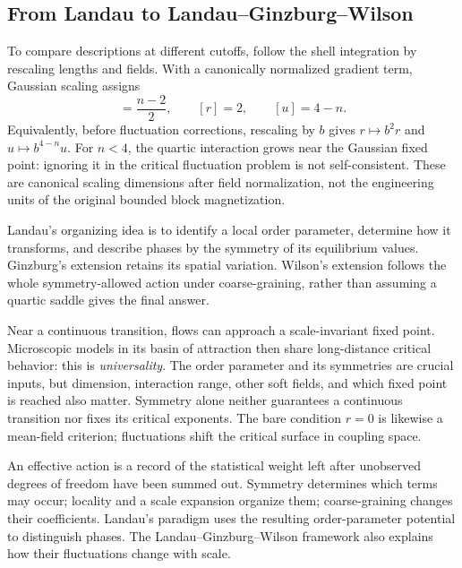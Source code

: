 \documentclass[11pt]{article}
\begin{document}
\subsection{From Landau to Landau--Ginzburg--Wilson}

To compare descriptions at different cutoffs, follow the shell integration
by rescaling lengths and fields. With a canonically normalized gradient
term, Gaussian scaling assigns
\begin{equation}
[m]=\frac{n-2}{2},\qquad [r]=2,\qquad [u]=4-n.
\end{equation}
Equivalently, before fluctuation corrections, rescaling by \(b\) gives
\(r\mapsto b^2r\) and \(u\mapsto b^{4-n}u\).
For \(n<4\), the quartic interaction grows near the Gaussian fixed point:
ignoring it in the critical fluctuation problem is not self-consistent.
These are canonical scaling dimensions after field normalization, not
the engineering units of the original bounded block magnetization.

Landau's organizing idea is to identify a local order parameter, determine
how it transforms, and describe phases by the symmetry of its equilibrium
values. Ginzburg's extension retains its spatial variation. Wilson's
extension follows the whole symmetry-allowed action under coarse-graining,
rather than assuming a quartic saddle gives the final answer.

Near a continuous transition, flows can approach a scale-invariant fixed
point. Microscopic models in its basin of attraction then share
long-distance critical behavior: this is \emph{universality}. The order
parameter and its symmetries are crucial inputs, but dimension, interaction
range, other soft fields, and which fixed point is reached also matter.
Symmetry alone neither guarantees a continuous transition nor fixes its
critical exponents. The bare condition \(r=0\) is likewise a mean-field
criterion; fluctuations shift the critical surface in coupling space.

\begin{keyidea}
An effective action is a record of the statistical weight left after
unobserved degrees of freedom have been summed out. Symmetry determines
which terms may occur; locality and a scale expansion organize them;
coarse-graining changes their coefficients. Landau's paradigm uses the
resulting order-parameter potential to distinguish phases. The
Landau--Ginzburg--Wilson framework also explains how their fluctuations
change with scale.
\end{keyidea}
\end{document}
